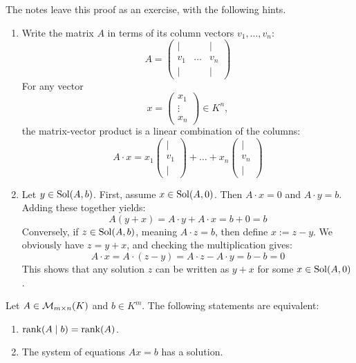 \begin{exercise}
\label{exc:non_homogeneous_solutions}
The notes leave this proof as an exercise, with the following hints.
\begin{enumerate}[label=\textbf{(\alph*)}]
    \item Write the matrix $A$ in terms of its column vectors $v_1, \dots, v_n$:
    \[
        A = \begin{pmatrix} | & & | \\ v_1 & \dots & v_n \\ | & & | \end{pmatrix}
    \]
    For any vector
    \[
        x = \begin{pmatrix} x_1 \\ \vdots \\ x_n \end{pmatrix} \in K^n,
    \]
    the matrix-vector product is a linear combination of the columns:
    \[
        A \cdot x = x_1 \begin{pmatrix} | \\ v_1 \\ | \end{pmatrix} + \dots + x_n \begin{pmatrix} | \\ v_n \\ | \end{pmatrix}
    \]

    \item Let $y \in \operatorname{Sol}(A, b)$. First, assume $x \in \operatorname{Sol}(A, 0)$. Then $A \cdot x = 0$ and $A \cdot y = b$. Adding these together yields:
    \[
        A(y + x) = A \cdot y + A \cdot x = b + 0 = b
    \]
    Conversely, if $z \in \operatorname{Sol}(A, b)$, meaning $A \cdot z = b$, then define $x := z - y$. We obviously have $z = y + x$, and checking the multiplication gives:
    \[
        A \cdot x = A \cdot (z - y) = A \cdot z - A \cdot y = b - b = 0
    \]
    This shows that any solution $z$ can be written as $y + x$ for some $x \in \operatorname{Sol}(A, 0)$.
\end{enumerate}
\end{exercise}

\begin{proposition}
\label{prop:rank_solvability_criterion}
Let $A \in \mathcal{M}_{m \times n}(K)$ and $b \in K^m$. The following statements are equivalent:
\begin{enumerate}
    \item $\operatorname{rank}(A \mid b) = \operatorname{rank}(A)$.
    \item The system of equations $Ax = b$ has a solution.
\end{enumerate}
\end{proposition}

